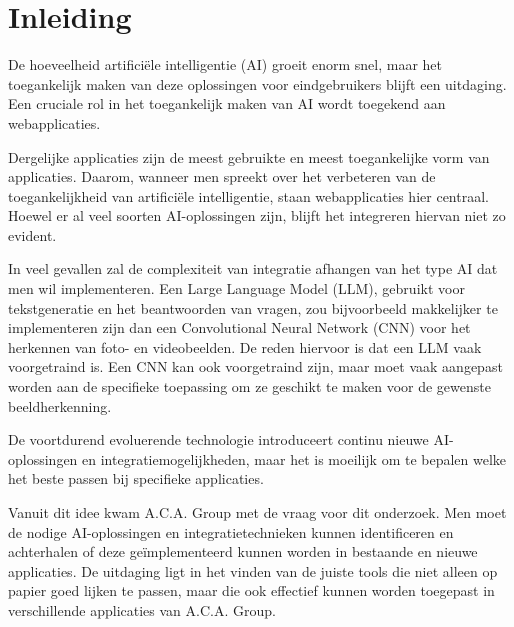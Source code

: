 \documentclass[dutch]{hogent-article}
\begin{document}

\section{Inleiding}%
\label{sec:Introduction}


De hoeveelheid artificiële intelligentie (AI) groeit enorm snel, maar het toegankelijk maken van deze oplossingen voor eindgebruikers blijft een uitdaging. Een cruciale rol in het toegankelijk maken van AI wordt toegekend aan webapplicaties.
  \setlength{\parskip}{1em}
  
  Dergelijke applicaties zijn de meest gebruikte en meest toegankelijke vorm van applicaties.\linebreak
  Daarom, wanneer men spreekt over het verbeteren van de toegankelijkheid van artificiële intelligentie, staan webapplicaties hier centraal. Hoewel er al veel soorten AI-oplossingen zijn, blijft het integreren hiervan niet zo evident.
  
  In veel gevallen zal de complexiteit van integratie afhangen van het type AI dat men wil implementeren. Een Large Language Model (LLM), gebruikt voor tekstgeneratie en het beantwoorden van vragen, zou bijvoorbeeld makkelijker te implementeren zijn dan een Convolutional Neural Network (CNN) voor het herkennen van foto- en videobeelden. De reden hiervoor is dat een LLM vaak voorgetraind is. Een CNN kan ook voorgetraind zijn, maar moet vaak aangepast worden aan de specifieke toepassing om ze geschikt te maken voor de gewenste beeldherkenning.
  
  De voortdurend evoluerende technologie introduceert continu nieuwe AI-oplossingen en integratiemogelijkheden, maar het is moeilijk om te bepalen welke het beste passen bij specifieke applicaties. 
  
  Vanuit dit idee kwam A.C.A. Group met de vraag voor dit onderzoek. Men moet de nodige AI-oplossingen en integratietechnieken kunnen identificeren en achterhalen of deze geïmplementeerd kunnen worden in bestaande en nieuwe applicaties. De uitdaging ligt in het vinden van de juiste tools die niet alleen op papier goed lijken te passen, maar die ook effectief kunnen worden toegepast in verschillende applicaties van A.C.A. Group. 
  
\end{document}

